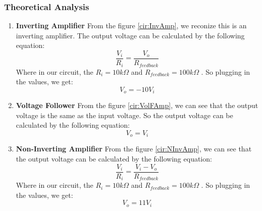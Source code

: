     \subsubsection{Theoretical Analysis}
        \begin{enumerate}[a]
            \item \textbf{Inverting Amplifier}\newline
                From the figure \ref{cir:InvAmp}, 
                we reconize this is an inverting amplifier. The output voltage can be calculated by the following equation:
                \begin{equation}
                    \frac{V_i}{R_i} = \frac{V_o}{R_{feedback}}
                \end{equation}
                Where in our circuit, the $R_i = 10k \Omega$ and $R_{feedback} = 100k \Omega$ . So plugging in the values, we get:
                \begin{equation}
                    V_o = -10V_i
                    \label{eq:InvAmp_output}
                \end{equation}

            \item \textbf{Voltage Follower}\newline
                From the figure \ref{cir:VolFAmp}, we can see that the output voltage is the same as the input voltage. So the output voltage can be calculated by the following equation:
                \begin{equation}
                    V_o = V_i
                    \label{eq:VolF_output}
                \end{equation}

                \item \textbf{Non-Inverting Amplifier}\newline
                From the figure \ref{cir:NInvAmp}, we can see that the output voltage can be calculated by the following equation:
                \begin{equation}
                    \frac{V_i}{R_i} = \frac{V_i-V_o}{R_{feedback}}
                \end{equation}
                Where in our circuit, the $R_i = 10k \Omega$ and $R_{feedback} = 100k \Omega$ . So plugging in the values, we get:
                \begin{equation}
                    V_o = 11V_i
                    \label{eq:NInvAmp_output}
                \end{equation}


\end{enumerate}
